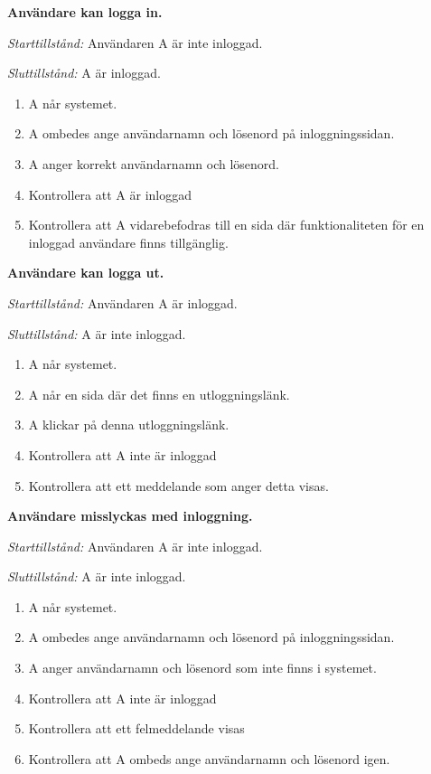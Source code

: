 \documentclass[a4paper]{article}
\begin{document}
\begin{ST}

\item
\textbf{Användare kan logga in.}

\emph{Starttillstånd:} Användaren A är inte inloggad.

\emph{Sluttillstånd:} A är inloggad.

\begin{enumerate}
\item A når systemet.
\item A ombedes ange användarnamn och lösenord på inloggningssidan.
\item A anger korrekt användarnamn och lösenord.
\item Kontrollera att A är inloggad
\item Kontrollera att A vidarebefodras till en sida där funktionaliteten för en inloggad användare finns tillgänglig.
\end{enumerate}

\item
\textbf{Användare kan logga ut.}

\emph{Starttillstånd:} Användaren A är inloggad.

\emph{Sluttillstånd:} A är inte inloggad.

\begin{enumerate}
\item A når systemet.
\item A når en sida där det finns en utloggningslänk.
\item A klickar på denna utloggningslänk.
\item Kontrollera att A inte är inloggad
\item Kontrollera att ett meddelande som anger detta visas.
\end{enumerate}

\item
\textbf{Användare misslyckas med inloggning.}

\emph{Starttillstånd:} Användaren A är inte inloggad.

\emph{Sluttillstånd:} A är inte inloggad.

\begin{enumerate}
\item A når systemet.
\item A ombedes ange användarnamn och lösenord på inloggningssidan.
\item A anger användarnamn och lösenord som inte finns i systemet.
\item Kontrollera att A inte är inloggad
\item Kontrollera att ett felmeddelande visas
\item Kontrollera att A ombeds ange användarnamn och lösenord igen.
\end{enumerate}

\end{ST}
\end{document}
